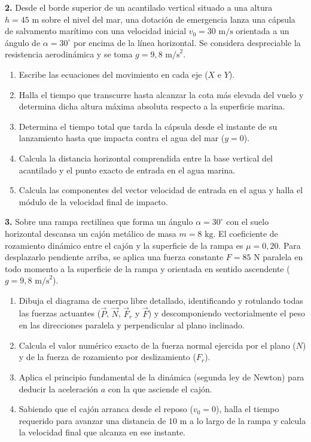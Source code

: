 \documentclass[11pt,a4paper]{article}
\begin{document}
\vspace{0.4cm}
\noindent\textbf{2.} Desde el borde superior de un acantilado vertical situado a una altura $h = 45\text{ m}$ sobre el nivel del mar, una dotación de emergencia lanza una cápsula de salvamento marítimo con una velocidad inicial $v_0 = 30\text{ m/s}$ orientada a un ángulo de $\alpha = 30^\circ$ por encima de la línea horizontal. Se considera despreciable la resistencia aerodinámica y se toma $g = 9{,}8\text{ m/s}^2$.
\begin{enumerate}[label=\textbf{\alph*)}, leftmargin=2em, itemsep=6pt]
    \item Escribe las ecuaciones del movimiento en cada eje ($X$ e $Y$).
    \item Halla el tiempo que transcurre hasta alcanzar la cota más elevada del vuelo y determina dicha altura máxima absoluta respecto a la superficie marina.
    \item Determina el tiempo total que tarda la cápsula desde el instante de su lanzamiento hasta que impacta contra el agua del mar ($y = 0$).
    \item Calcula la distancia horizontal comprendida entre la base vertical del acantilado y el punto exacto de entrada en el agua marina.
    \item Calcula las componentes del vector velocidad de entrada en el agua y halla el módulo de la velocidad final de impacto.
\end{enumerate}

\newpage

\noindent\textbf{3.} Sobre una rampa rectilínea que forma un ángulo $\alpha = 30^\circ$ con el suelo horizontal descansa un cajón metálico de masa $m = 8\text{ kg}$. El coeficiente de rozamiento dinámico entre el cajón y la superficie de la rampa es $\mu = 0{,}20$. Para desplazarlo pendiente arriba, se aplica una fuerza constante $F = 85\text{ N}$ paralela en todo momento a la superficie de la rampa y orientada en sentido ascendente ($g = 9{,}8\text{ m/s}^2$).
\begin{enumerate}[label=\textbf{\alph*)}, leftmargin=2em, itemsep=6pt]
    \item Dibuja el diagrama de cuerpo libre detallado, identificando y rotulando todas las fuerzas actuantes ($\vec{P}$, $\vec{N}$, $\vec{F}_r$ y $\vec{F}$) y descomponiendo vectorialmente el peso en las direcciones paralela y perpendicular al plano inclinado.
    \item Calcula el valor numérico exacto de la fuerza normal ejercida por el plano ($N$) y de la fuerza de rozamiento por deslizamiento ($F_r$).
    \item Aplica el principio fundamental de la dinámica (segunda ley de Newton) para deducir la aceleración $a$ con la que asciende el cajón.
    \item Sabiendo que el cajón arranca desde el reposo ($v_0 = 0$), halla el tiempo requerido para avanzar una distancia de $10\text{ m}$ a lo largo de la rampa y calcula la velocidad final que alcanza en ese instante.
\end{enumerate}
\end{document}
